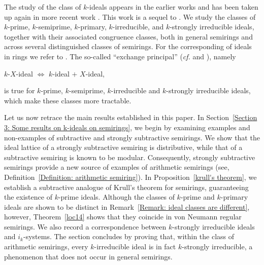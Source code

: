 \documentclass[11pt,english]{amsart}
\theoremstyle{definition}
\numberwithin{equation}{section}
\begin{document}
The study of the class of $k$-ideals appears in the earlier works \cite{LaTorre65, SenAdhikari92, SenAdhikari93, Han15, Han21, JunRayTolliver22, WeinertSenAdhikari96} and has been taken up again in more recent work \cite{GoswamiDube24}. This work is a sequel to \cite{GoswamiDube24}. We study the classes of $k$-prime, $k$-semiprime, $k$-primary, $k$-irreducible, and $k$-strongly irreducible ideals, together with their associated congruence classes, both in general semirings and across several distinguished classes of semirings. For the corresponding of ideals in rings we refer to \cite{AtiyahMacdonald, Azizi08, Schwartz16}.
The so-called ``exchange principal'' (\textit{cf.}\cite[Proposition 3.5]{JunRayTolliver22} and \cite[Proposition 3.11, Proposition 3.21]{GoswamiDube24}), namely
\begin{center}
 $k$-$X$-ideal $\iff $ $k$-ideal $+$ $X$-ideal,   
\end{center}
is true for $k$-prime, $k$-semiprime, $k$-irreducible and $k$-strongly irreducible ideals, which make these classes more tractable. 

Let us now retrace the main results established in this paper. 
In Section~\ref{Section 3: Some results on k-ideals on semirings}, we begin by examining examples and non-examples of subtractive and strongly subtractive semirings. We show that the ideal lattice of a strongly subtractive semiring is distributive, while that of a subtractive semiring is known to be modular. Consequently, strongly subtractive semirings provide a new source of examples of arithmetic semirings (see, Definition~\ref{Definition: arithmetic semiring}). In Proposition~\ref{krull's theorem}, we establish a subtractive analogue of Krull’s theorem for semirings, guaranteeing the existence of $k$-prime ideals. Although the classes of $k$-prime and $k$-primary ideals are shown to be distinct in Remark~\ref{Remark: ideal classes are different}, however, Theorem~\ref{loc14} shows that they coincide in von Neumann regular semirings. We also record a correspondence between $k$-strongly irreducible ideals and $i_k$-systems. The section concludes by proving that, within the class of arithmetic semirings, every $k$-irreducible ideal is in fact $k$-strongly irreducible, a phenomenon that does not occur in general semirings. 
\end{document}
